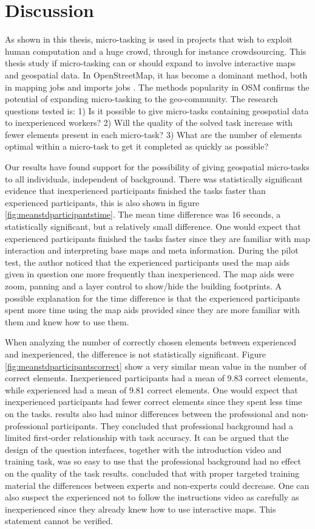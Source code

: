 \chapter{Discussion}
As shown in this thesis, micro-tasking is used in projects that wish to exploit human computation and a huge crowd, through for instance crowdsourcing. This thesis study if micro-tasking can or should expand to involve interactive maps and geospatial data. In OpenStreetMap, it has become a dominant method, both in mapping jobs and imports jobs \citep{Erichsen2016}. The methods popularity in OSM confirms the potential of expanding micro-tasking to the geo-community. The research questions tested is: 1) Is it possible to give micro-tasks containing geospatial data to inexperienced workers? 2) Will the quality of the solved task increase with fewer elements present in each micro-task? 3) What are the number of elements optimal within a micro-task to get it completed as quickly as possible?

Our results have found support for the possibility of giving geospatial micro-tasks to all individuals, independent of background. There was statistically significant evidence that inexperienced participants finished the tasks faster than experienced participants, this is also shown in figure \ref{fig:meanstdparticipantstime}. The mean time difference was 16 seconds, a statistically significant, but a relatively small difference. One would expect that experienced participants finished the tasks faster since they are familiar with map interaction and interpreting base maps and meta information. During the pilot test, the author noticed that the experienced participants used the map aids given in question one more frequently than inexperienced. The map aids were zoom, panning and a layer control to show/hide the building footprints. A possible explanation for the time difference is that the experienced participants spent more time using the map aids provided since they are more familiar with them and knew how to use them. 

When analyzing the number of correctly chosen elements between experienced and inexperienced, the difference is not statistically significant. Figure \ref{fig:meanstdparticipantscorrect} show a very similar mean value in the number of correct elements. Inexperienced participants had a mean of 9.83 correct elements, while experienced had a mean of 9.81 correct elements. One would expect that inexperienced participants had fewer correct elements since they spent less time on the tasks. \cite{Salk2016} results also had minor differences between the professional and non-professional participants. They concluded that professional background had a limited first-order relationship with task accuracy. It can be argued that the design of the question interfaces, together with the introduction video and training task, was so easy to use that the professional background had no effect on the quality of the task results. \cite{See2013} concluded that with proper targeted training material the differences between experts and non-experts could decrease. One can also suspect the experienced not to follow the instructions video as carefully as inexperienced since they already knew how to use interactive maps. This statement cannot be verified.

